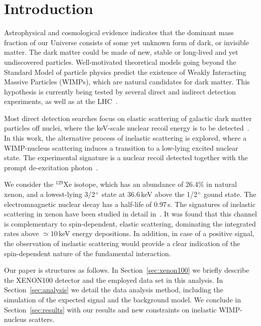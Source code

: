 \section{\label{sec:intro} Introduction}

Astrophysical and cosmological evidence indicates that the dominant mass fraction of our Universe consists of some yet unknown
form of dark, or invisible matter. The dark matter could be made of new, stable or long-lived and yet undiscovered particles. Well-motivated
theoretical models going beyond the Standard Model of particle physics predict the existence of Weakly Interacting Massive
Particles (WIMPs), which are natural candidates for dark matter. This hypothesis is currently being tested by several direct
and indirect detection experiments, as well as at the LHC~\cite{Bertone:2010zza,Baudis:2016qwx}.

Most direct detection searches focus on elastic scattering of galactic dark matter particles off nuclei, where the keV-scale 
nuclear recoil energy is to be detected~\cite{Baudis:2012ig,Baudis:2015mpa,Undagoitia:2015gya}. In this work, the 
alternative process of inelastic scattering is explored, where a WIMP-nucleus scattering induces a transition to a low-lying 
excited nuclear state. The experimental signature is a nuclear recoil detected together with the prompt de-excitation 
photon~\cite{Ellis:1988nb}. 

We consider the $^{129}\text{Xe}$ isotope, which has an abundance of 26.4\% in natural xenon, and a lowest-lying 
3/2$^{+}$ state at 36.6\,keV above the 1/2$^+$ gound state. The electromnagnetic nuclear decay has a half-life of 0.97\,s. 
The signatures of inelastic scattering in xenon have been studied in detail in~\cite{Baudis:2013bba}. It was found that this 
channel is complementary to spin-dependent, elastic scattering, dominating the integrated rates above $\simeq10$\,keV energy 
depositions. In addition, in case of a positive signal, the observation of inelastic scattering would provide a clear 
indication of the spin-dependent nature of the fundamental interaction. 

Our paper is structures as follows.  In Section~\ref{sec:xenon100} we briefly describe the XENON100 detector and the employed data 
set in this analysis. In Section~\ref{sec:analysis} we detail the data analysis method, including the simulation of the expected signal and the 
background model. We conclude in Section~\ref{sec:results} with our results and new constraints on inelastic WIMP-nucleus scatters.

